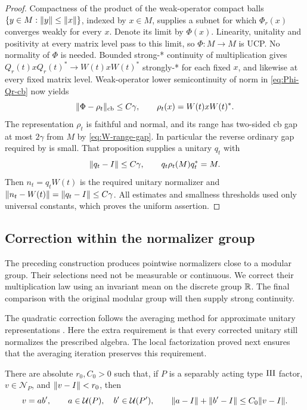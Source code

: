 \begin{proof}
Compactness of the product of the weak-operator compact balls
$\{y\in M:\lVert y\rVert\leq\lVert x\rVert\}$, indexed by $x\in M$, supplies
a subnet for which $\Phi_r(x)$ converges weakly for every $x$.
Denote its limit by $\Phi(x)$.  Linearity, unitality and positivity
at every matrix level pass to this limit, so $\Phi:M\to M$ is UCP.
No normality of $\Phi$ is needed.  Bounded strong-* continuity of
multiplication gives
$Q_r(t)xQ_r(t)^*\to W(t)xW(t)^*$ strongly-* for each fixed $x$,
and likewise at every fixed matrix level.  Weak-operator lower
semicontinuity of norm in \eqref{eq:Phi-Qr-cb} now yields
\[
 \lVert\Phi-\rho_t\rVert_{\mathrm{cb}}\leq C\gamma,
 \qquad \rho_t(x)=W(t)xW(t)^*.
\]
The representation $\rho_t$ is faithful and normal, and its range
has two-sided cb gap at most $2\gamma$ from $M$ by
\eqref{eq:W-range-gap}.  In particular the reverse ordinary gap
required by  is small.  That proposition supplies a
unitary $q_t$ with
\[
 \lVert q_t-I\rVert\leq C\gamma,\qquad
 q_t\rho_t(M)q_t^*=M.
\]
Then $n_t=q_tW(t)$ is the required unitary normalizer and
$\lVert n_t-W(t)\rVert=\lVert q_t-I\rVert\leq C\gamma$.
All estimates and smallness thresholds used only universal constants,
which proves the uniform assertion.
\end{proof}


\subsection{Correction within the normalizer group}

The preceding construction produces pointwise normalizers close to
a modular group. Their selections need not be measurable or continuous.
We correct their multiplication law using an invariant mean on the
discrete group $\mathbb R$. The final comparison with the original modular
group will then supply strong continuity.

The quadratic correction follows the averaging method for approximate
unitary representations \cite{Kazhdan1982,BurgerOzawaThom2013}.
Here the extra requirement is that every corrected unitary still
normalizes the prescribed algebra. The local factorization proved next
ensures that the averaging iteration preserves this requirement.

\begin{lemma}
\label{lem:small-exact-normalizer}
There are absolute $r_0,C_0>0$ such that, if $P$ is a separably
acting type $\mathrm{III}$ factor, $v\in\mathcal N_P$, and
$\lVert v-I\rVert<r_0$, then
\[
 v=ab',\qquad a\in\mathcal U(P),\quad b'\in\mathcal U(P'),
 \qquad \lVert a-I\rVert+\lVert b'-I\rVert\le C_0\lVert v-I\rVert.
\]
\end{lemma}


